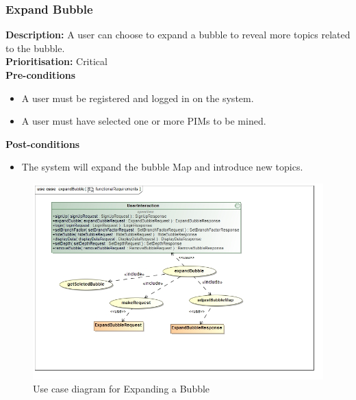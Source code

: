 \documentclass[hidelinks,english]{article}
\begin{document}
    		\subsubsection{Expand Bubble}
				\textbf{Description:}  A user can choose to expand a bubble to reveal more topics related to the bubble.\\
			    \textbf{Prioritisation:} Critical\\
      			\textbf{Pre-conditions}
			    \begin{itemize}
			        \item A user must be registered and logged in on the system.
			        \item A user must have selected one or more PIMs to be mined.
			    \end{itemize}
			    \textbf{Post-conditions}
			     \begin{itemize}
			        \item The system will expand the bubble Map and introduce new topics.
			    \end{itemize}
			    
			    \begin{figure}[!h]
    			\includegraphics[width=\linewidth]{functionalRequirementsExpandBubble.jpg}
    			\caption{Use case diagram for Expanding a Bubble}
    			\label{UseCaseExpandBubble}
    			\end{figure}
    			
\end{document}

